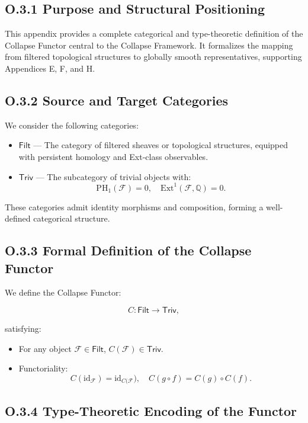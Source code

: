 \documentclass[11pt]{article}
\begin{document}
\subsection*{O.3.1 Purpose and Structural Positioning}

This appendix provides a complete categorical and type-theoretic definition of the Collapse Functor central to the Collapse Framework.  
It formalizes the mapping from filtered topological structures to globally smooth representatives, supporting Appendices E, F, and H.

\subsection*{O.3.2 Source and Target Categories}

We consider the following categories:

\begin{itemize}
  \item \( \mathsf{Filt} \) — The category of filtered sheaves or topological structures, equipped with persistent homology and Ext-class observables.
  \item \( \mathsf{Triv} \) — The subcategory of trivial objects with:
  \[
  \mathrm{PH}_1(\mathcal{F}) = 0,\quad \mathrm{Ext}^1(\mathcal{F}, \mathbb{Q}) = 0.
  \]
\end{itemize}

These categories admit identity morphisms and composition, forming a well-defined categorical structure.

\subsection*{O.3.3 Formal Definition of the Collapse Functor}

We define the Collapse Functor:

\[
C : \mathsf{Filt} \longrightarrow \mathsf{Triv},
\]

satisfying:

\begin{itemize}
  \item For any object \( \mathcal{F} \in \mathsf{Filt} \), \( C(\mathcal{F}) \in \mathsf{Triv} \).
  \item Functoriality:
  \[
  C(\mathrm{id}_{\mathcal{F}}) = \mathrm{id}_{C(\mathcal{F}}),
  \quad
  C(g \circ f) = C(g) \circ C(f).
  \]
\end{itemize}

\subsection*{O.3.4 Type-Theoretic Encoding of the Functor}
\end{document}
